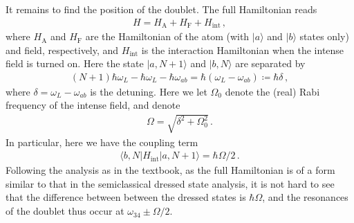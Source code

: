 \documentclass[11pt, oneside]{book}
\theoremstyle{break}
\theoremstyle{break}
\begin{document}
It remains to find the position of the doublet. The full Hamiltonian reads
\begin{align*}
H = H_{\text{A}} + H_{\text{F}} + H_{\text{int}}\,,
\end{align*}
where $H_{\text{A}}$ and $H_{\text{F}}$ are the Hamiltonian of the atom (with $|a\rangle$ and $|b\rangle$ states only) and field, respectively, and $H_{\text{int}}$ is the interaction Hamiltonian when the intense field is turned on. Here the state $|a,N+1\rangle$ and $|b,N\rangle$ are separated by
\begin{align*}
(N+1)\hbar \omega_L - \hbar \omega_L - \hbar \omega_{ab} = \hbar (\omega_L - \omega_{ab}) \coloneqq \hbar \delta\,,
\end{align*}
where $\delta=\omega_L - \omega_{ab}$ is the detuning. Here we let $\Omega_0$ denote the (real) Rabi frequency of the intense field, and denote
\begin{align*}
\Omega = \sqrt{\delta^2 + \Omega_0^2}\,.
\end{align*}
In particular, here we have the coupling term
\begin{align*}
\langle b, N | H_{\text{int}} | a, N+1\rangle = \hbar \Omega/2\,.
\end{align*}
Following the analysis as in the textbook, as the full Hamiltonian is of a form similar to that in the semiclassical dressed state analysis, it is not hard to see that the difference between between the dressed states is $\hbar \Omega$, and the resonances of the doublet thus occur at $\omega_{34}\pm \Omega/2$. 
\end{document}

